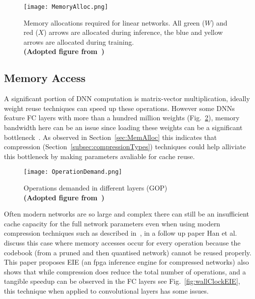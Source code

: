 \documentclass[../../D1.tex]{subfiles}
\begin{document}
\begin{figure}[H]
    \texttt{[image: MemoryAlloc.png]} 
    \caption{Memory allocations required for linear networks. All green ($W$) and red ($X$) arrows are allocated during inference, the blue and yellow arrows are allocated during training.\\ \textbf{(Adopted figure from~\autocite{rhuVDNNVirtualizedDeep2016})}}
    \label{fig:memAllocInf}   
\end{figure}


\subsection{Memory Access}

A significant portion of DNN computation is matrix-vector multiplication, ideally weight reuse techniques can speed up these operations.
However some DNNs feature FC layers with more than a hundred million weights (Fig.~\ref{fig:CNNcomplexity}), memory bandwidth here can be an issue since loading these weights can be a significant bottleneck~\autocite{qiuGoingDeeperEmbedded2016}. 
As observed in Section~\ref{sec:MemAlloc} this indicates that compression (Section~\ref{subsec:compressionTypes}) techniques could help alliviate this bottleneck by making parameters avaliable for cache reuse.

\begin{figure}[H]
    \begin{center}
        \texttt{[image: OperationDemand.png]} 
    \end{center}
    
    \caption{Operations demanded in different layers (GOP)\\ \textbf{(Adopted figure from~\autocite{qiuGoingDeeperEmbedded2016})}}
    \label{fig:CNNcomplexity}   
\end{figure}

Often modern networks are so large and complex there can still be an insufficient cache capacity for the full network parameters even when using modern compression techniques such as described in~\autocite{hanDeepCompressionCompressing2016}, in a follow up paper Han et al.~\autocite{hanEIEEfficientInference2016} discuss this case where memory accesses occur for every operation because the codebook (from a pruned and then quantised network) cannot be reused properly.
This paper proposes EIE (an \acrshort{fpga} inference engine for compressed networks) also shows that while compression does reduce the total number of operations, and a tangible speedup can be observed in the FC layers see Fig.~\ref{fig:wallClockEIE}, this technique when applied to convolutional layers has some issues.
\end{document}
